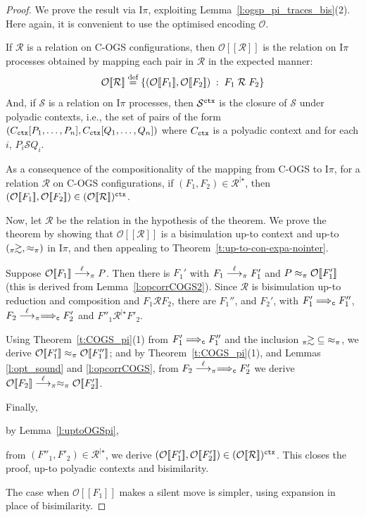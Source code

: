 \documentclass[11pt,a4paper]{amsart}
\theoremstyle{plain}
\theoremstyle{definition}
\theoremstyle{defC}
\theoremstyle{thmC}
\theoremstyle{plain}
\numberwithin{equation}{section}
\newif\iflong\longtrue
\newcommand{\COGS}{\mbox{{\rm C-OGS}}\xspace}      %
\newcommand{\uptoComp}[1]{\mathrel{#1^{|\star}}}
\newcommand{\ctx}[1]{#1^{\rmm{ctx}}  }   %
\newcommand{\ct}[1]{ C_{\rmm{ctx}} \brac{#1} }   %
\newcommand{\qct}{ C_{\rmm{ctx}}  }              %
\newcommand{\brac}[1]{[#1] }   %
\newcommand{\rmm}[1]{{\tt{\lowercase{#1}}}}
\newcommand{\genarr}[2]{\mathrel{\stackrel{{#1}}{\longrightarrow}_{\rmm{\lowercase{#2}}}}}
\newcommand{\genLongrightarrow}[1]{\mathrel{\Longrightarrow_{\rmm{\lowercase{#1}}}}}
\newcommand{\arrPI}[1]{\genarr{#1}{\pi}}   %
\newcommand{\Longrightarrowp}{\genLongrightarrow{C}}
\newcommand{\genwb}[1]{\mathrel{\approx_{\rmm{\lowercase{#1}}}}}       %
\newcommand{\wbPI}{\genwb{\pi}}       %
\newcommand{\contr}{\mathrel{\mbox{}_{\pi}\!\!\gtrsim}}
\def\R{{\mathcal R}}
\def\RR{\mathrel{\mathcal R}}
\def\S{{\mathcal S}}
\def\SS{\mathrel{\mathcal S}}
\def\defi{\stackrel{\mbox{\scriptsize {\rm{def}}}}{=}} %
\def\st{\; : \;}
\newcommand{\FF}{F}
\newcommand{\encoEnvV}[1]{{\mathcal {O}} [\! [ #1 ] \! ]  } %
\newcommand{\encoConV}{\encoEnvV} %
\newcommand{\qencV}{{\mathcal O}}  %
\newcommand{\Intp}{\mbox{I$\pi$}\xspace}   %
\newcommand{\piI}{\Intp}   %
\theoremstyle{plain}
\theoremstyle{definition}
\begin{document}
\begin{proof}
We prove the result via \piI, exploiting Lemma~\ref{l:ogsp_pi_traces_bis}(2).
Here again, it is convenient to use
the optimised encoding $\qencV$.

If $\R$ is a relation on \COGS configurations, then 
$\encoConV \R$ is the relation on \piI processes obtained by mapping each pair
in $\R$ in the expected manner: 
\[ \encoConV \R \defi \{ (\encoConV {\FF_1}, \encoConV {\FF_2}) \st \FF_1 \RR \FF_2 
 \} \] 
And, if $\S$ is a relation on \piI processes, then $\ctx \S$ is the closure of $\S$ under
polyadic contexts, i.e., the set of pairs  of the form  
$(\ct {P_1,\ldots, P_n},\ct {Q_1,\ldots, Q_n})$ where $\qct$ is a polyadic context and for
each $i$, $P_i \SS Q_i$. 

As a consequence of the compositionality of the mapping from
\COGS to \piI,
for  a relation   $\R$ on \COGS configurations, 
if ${(\FF_1, \FF_2)} \in  { \uptoComp \R}$, then 
$( \encoConV {\FF_1},  \encoConV {\FF_2}) \in  \ctx{( \encoConV{ \R })}$. 




Now, let $\R$ be the relation in the hypothesis of the theorem.
We  prove the theorem by  showing that 
$\encoConV \R$ is a bisimulation
 up-to context and up-to $(\contr,
 \wbPI)$ in 
\piI, and then appealing to Theorem~\ref{t:up-to-con-expa-nointer}.  

Suppose 
$\encoConV {\FF_1}  \arrPI \ell P$.  Then
there is $\FF_1'$ with  
$\FF_1  \arrPI \ell \FF_1' $ and $P  \wbPI \encoConV {\FF'_1}$ (this is derived from
Lemma~\ref{l:opcorrCOGS2}).  
Since $\R$ is bisimulation up-to
 reduction and  composition and $\FF_1 \RR \FF_2$, there are 
  $\FF_1''$, and $\FF_2'$, with  
$\FF'_1 \Longrightarrowp \FF''_1$, 
$\FF_2
  \arrPI \ell \Longrightarrowp \FF_2' $ and
$\FF''_1 \uptoComp \R \FF'_2$. 


Using  Theorem~\ref{t:COGS_pi}(1) 
from 
$\FF'_1 \Longrightarrowp \FF''_1$ and the inclusion ${\contr} \subseteq
{\wbPI}$, 
we derive
$\encoConV {\FF'_1}  \wbPI  \encoConV {\FF''_1}$; 
and  by   
Theorem~\ref{t:COGS_pi}(1),
and  Lemmas \ref{l:opt_sound} and \ref{l:opcorrCOGS},  from 
$\FF_2
  \arrPI \ell \Longrightarrowp \FF_2' $ 
we derive
$\encoConV {\FF_2}  \arrPI \ell \wbPI  \encoConV {\FF'_2}$.   


Finally,  
\iflong
by Lemma~\ref{l:uptoOGSpi},  
\fi
from $(\FF''_1, \FF'_2) \in  \uptoComp \R$, we derive 
 $( \encoConV {\FF'_1},  \encoConV {\FF'_2}) \in  \ctx{( \encoConV{ \R })}$. 
This closes the proof, up-to polyadic contexts and bisimilarity.

The case when 
$\encoConV {\FF_1}$ makes a silent move is simpler,  
using expansion in place of bisimilarity.
\end{proof} 
\end{document}
